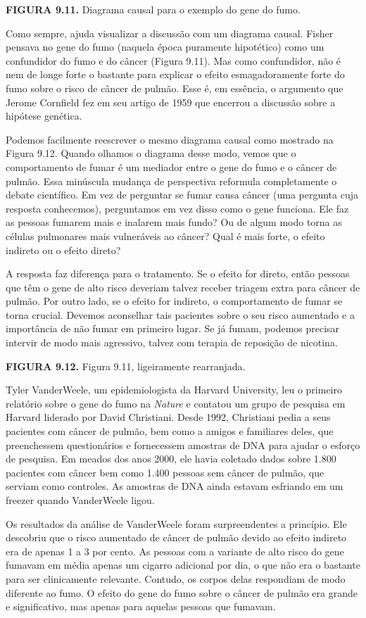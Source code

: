 \documentclass[11pt,a5paper,twoside]{book}
\begin{document}
\textbf{FIGURA 9.11.} Diagrama causal para o exemplo do gene do fumo.

Como sempre, ajuda visualizar a discussão com um diagrama causal. Fisher pensava no gene do fumo (naquela época puramente hipotético) como um confundidor do fumo e do câncer (Figura 9.11). Mas como confundidor, não é nem de longe forte o bastante para explicar o efeito esmagadoramente forte do fumo sobre o risco de câncer de pulmão. Esse é, em essência, o argumento que Jerome Cornfield fez em seu artigo de 1959 que encerrou a discussão sobre a hipótese genética.

Podemos facilmente reescrever o mesmo diagrama causal como mostrado na Figura 9.12. Quando olhamos o diagrama desse modo, vemos que o comportamento de fumar é um mediador entre o gene do fumo e o câncer de pulmão. Essa minúscula mudança de perspectiva reformula completamente o debate científico. Em vez de perguntar se fumar causa câncer (uma pergunta cuja resposta conhecemos), perguntamos em vez disso como o gene funciona. Ele faz as pessoas fumarem mais e inalarem mais fundo? Ou de algum modo torna as células pulmonares mais vulneráveis ao câncer? Qual é mais forte, o efeito indireto ou o efeito direto?

A resposta faz diferença para o tratamento. Se o efeito for direto, então pessoas que têm o gene de alto risco deveriam talvez receber triagem extra para câncer de pulmão. Por outro lado, se o efeito for indireto, o comportamento de fumar se torna crucial. Devemos aconselhar tais pacientes sobre o seu risco aumentado e a importância de não fumar em primeiro lugar. Se já fumam, podemos precisar intervir de modo mais agressivo, talvez com terapia de reposição de nicotina.

\textbf{FIGURA 9.12.} Figura 9.11, ligeiramente rearranjada.

Tyler VanderWeele, um epidemiologista da Harvard University, leu o primeiro relatório sobre o gene do fumo na \textit{Nature} e contatou um grupo de pesquisa em Harvard liderado por David Christiani. Desde 1992, Christiani pedia a seus pacientes com câncer de pulmão, bem como a amigos e familiares deles, que preenchessem questionários e fornecessem amostras de DNA para ajudar o esforço de pesquisa. Em meados dos anos 2000, ele havia coletado dados sobre 1.800 pacientes com câncer bem como 1.400 pessoas sem câncer de pulmão, que serviam como controles. As amostras de DNA ainda estavam esfriando em um freezer quando VanderWeele ligou.

Os resultados da análise de VanderWeele foram surpreendentes a princípio. Ele descobriu que o risco aumentado de câncer de pulmão devido ao efeito indireto era de apenas 1 a 3 por cento. As pessoas com a variante de alto risco do gene fumavam em média apenas um cigarro adicional por dia, o que não era o bastante para ser clinicamente relevante. Contudo, os corpos delas respondiam de modo diferente ao fumo. O efeito do gene do fumo sobre o câncer de pulmão era grande e significativo, mas apenas para aquelas pessoas que fumavam.
\end{document}
